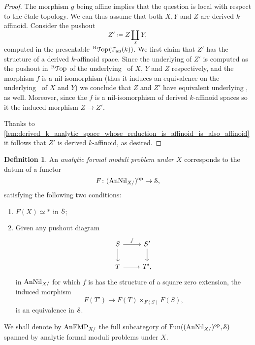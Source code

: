 \documentclass[10pt,a4paper,reqno]{amsart} %
\theoremstyle{plain}
\theoremstyle{definition}
\newtheorem{defin}[thm]{Definition}
\theoremstyle{remark}
\numberwithin{equation}{section}
\begin{document}
\begin{proof}
    The morphism $g$ being affine implies that the question is local with respect to the \'etale topology. We can thus assume that both $X, Y$ and $Z$
    are derived $k$-affinoid. Consider the pushout 
        \[
            Z' \coloneqq Z \coprod_X Y,  
        \]
    computed in the presentable \infcat $\RTop(\cTan(k))$. We first claim that $Z'$ has the structure of a derived $k$-affinoid space. Since the underlying \inftopos
    of $Z'$ is computed as the pushout in $\RTop$ of the underlying \inftopoi \ of $X$, $Y$ and $Z$ respectively, and the morphism $f$ is a nil-isomorphism
    (thus it induces an equivalence on the underlying \inftopoi \ of $X$ and $Y$) we conclude that
    $Z$ and $Z'$ have equivalent underlying \inftopoi, as well. Moreover, since the $f$ is a nil-isomorphism of derived $k$-affinoid spaces so it
    the induced morphism $Z \to Z'$. 

    Thanks to \cref{lem:derived_k_analytic_space_whose_reduction_is_affinoid_is_also_affinoid} it follows that $Z'$ is derived $k$-affinoid, as desired.
\end{proof}


\begin{defin}
    An \emph{analytic formal moduli problem under $X$} corresponds to the datum of a functor
        \[F \colon (\mathrm{AnNil}_{X/})^\mathrm{op} \to \mathcal S,\]
    satisfying the following two conditions:
    \begin{enumerate}
        \item $F(X) \simeq *$ in $\mathcal S$;
        \item Given any pushout diagram
            \[\begin{tikzcd}
                S \ar{r}{f} \ar{d} & S' \ar{d} \\
                T \ar{r} & T',
            \end{tikzcd}\]
        in $\mathrm{AnNil}_{X/}$ for which $f$ is has the structure of a square zero extension, the induced morphism
            \[F(T') \to F(T) \times_{F(S)}F(S),\]
        is an equivalence in $\mathcal S$.
    \end{enumerate}
    We shall denote by $\mathrm{AnFMP}_{X/}$ the full subcategory of $\operatorname{Fun}((\mathrm{AnNil}_{X/ })^\mathrm{op}, \mathcal S)$ spanned by analytic formal moduli problems
    under $X$.
\end{defin}
\end{document}
